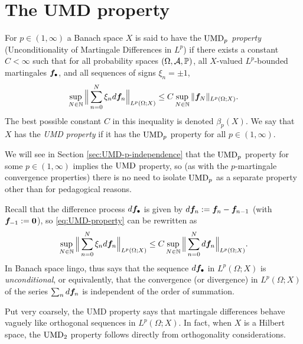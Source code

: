 
\section{The UMD property}

\begin{defn}
  For $p \in (1,\infty)$ a Banach space $X$ is said to have the \emph{$\mathrm{UMD}_{p}$ property} (Unconditionality of Martingale Differences in $L^p$) if there exists a constant $C < \infty$ such that for all probability spaces $(\Omega,\mathcal{A},\mathbb{P})$, all $X$-valued $L^p$-bounded martingales $\bm{f}_{\bullet}$, and all sequences of signs $\xi_n = \pm 1$,
  \begin{equation}\label{eq:UMD-property}
    \sup_{N \in \mathbb{N}} \Big\| \sum_{n=0}^{N} \xi_{n} d\bm{f}_{n} \Big\|_{L^p(\Omega;X)} \leq C \sup_{N \in \mathbb{N}} \|\bm{f}_N\|_{L^p(\Omega;X)}.
  \end{equation}
  The best possible constant $C$ in this inequality is denoted $\beta_{p}(X)$.
  We say that $X$ has the \emph{UMD property} if it has the $\mathrm{UMD}_{p}$ property for all $p \in (1,\infty)$.
\end{defn}

\begin{rmk}
  We will see in Section \ref{sec:UMD-p-independence} that the $\mathrm{UMD}_{p}$ property for some $p \in (1,\infty)$ implies the $\mathrm{UMD}$ property, so (as with the $p$-martingale convergence properties) there is no need to isolate $\mathrm{UMD}_{p}$ as a separate property other than for pedagogical reasons.
\end{rmk}

Recall that the difference process $d\bm{f}_{\bullet}$ is given by $d\bm{f}_{n} := \bm{f}_n - \bm{f}_{n-1}$ (with $\bm{f}_{-1} := \bm{0}$), so \eqref{eq:UMD-property} can be rewritten as
\begin{equation*}
  \sup_{N \in \mathbb{N}} \Big\| \sum_{n=0}^{N} \xi_{n} d\bm{f}_{n} \Big\|_{L^p(\Omega;X)} \leq C \sup_{N \in \mathbb{N}} \Big\| \sum_{n=0}^{N} d\bm{f}_{n}\Big\|_{L^p(\Omega;X)}.
\end{equation*}
In Banach space lingo, thus says that the sequence $d\bm{f}_\bullet$ in $L^p(\Omega;X)$ is \emph{unconditional}, or equivalently, that the convergence (or divergence) in $L^p(\Omega;X)$ of the series $\sum_{n} d\bm{f}_n$ is independent of the order of summation.

Put very coarsely, the UMD property says that martingale differences behave vaguely like orthogonal sequences in $L^p(\Omega;X)$.
In fact, when $X$ is a Hilbert space, the $\mathrm{UMD}_{2}$ property follows directly from orthogonality considerations.

